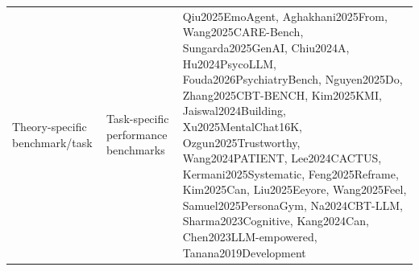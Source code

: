 \begin{longtable}{p{4cm}p{5cm}p{6cm}}
Theory-specific benchmark/task & Task-specific performance benchmarks & Qiu2025EmoAgent, Aghakhani2025From, Wang2025CARE-Bench, Sungarda2025GenAI, Chiu2024A, Hu2024PsycoLLM, Fouda2026PsychiatryBench, Nguyen2025Do, Zhang2025CBT-BENCH, Kim2025KMI, Jaiswal2024Building, Xu2025MentalChat16K, Ozgun2025Trustworthy, Wang2024PATIENT, Lee2024CACTUS, Kermani2025Systematic, Feng2025Reframe, Kim2025Can, Liu2025Eeyore, Wang2025Feel, Samuel2025PersonaGym, Na2024CBT-LLM, Sharma2023Cognitive, Kang2024Can, Chen2023LLM-empowered, Tanana2019Development \\
\end{longtable}
